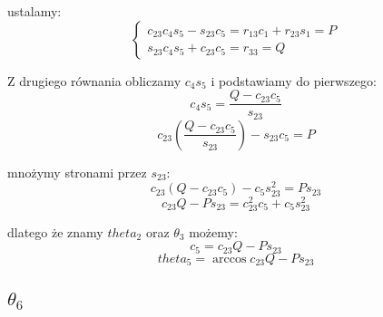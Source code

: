 \documentclass[]{article}
\begin{document}
ustalamy:
\[ \left\{\begin{array}{c}
c_{23}c_4s_5 - s_{23}c_5 = r_{13}c_1 + r_{23}s_1 = P\\
s_{23}c_4s_5 + c_{23}c_5 = r_{33} = Q
\end{array} \right. \]

Z drugiego równania obliczamy $c_4s_5$ i podstawiamy do pierwszego:
\[ c_4s_5 = \frac{Q-c_{23}c_5}{s_{23}} \]
\[ c_{23}(\frac{Q-c_{23}c_5}{s_{23}})-s_{23}c_5  = P\]

mnożymy stronami przez $s_{23}$:
\[ c_{23}(Q-c_{23}c_5) - c_5s_{23}^2 = Ps_{23} \]
\[ c_{23}Q - Ps_{23} = c_{23}^2c_5 + c_5s_{23}^2 \]

dlatego że znamy $theta_2$ oraz $\theta_3$ możemy:
\[c_5 = c_{23}Q - Ps_{23}\]
\[ theta_5 = \arccos{c_{23}Q - Ps_{23}} \]
\subsection{$\theta_6$}
\end{document}
